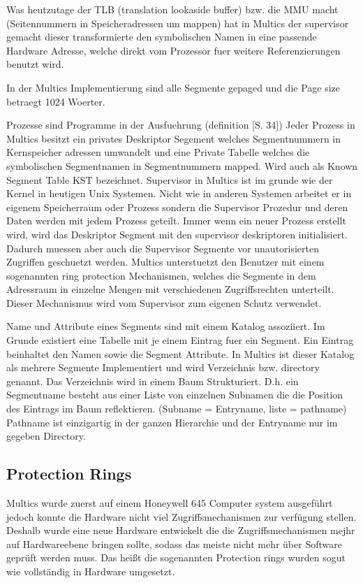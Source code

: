 \documentclass[9pt,technote]{IEEEtran}
\begin{document}
 Was heutzutage der TLB (translation lookaside buffer) bzw. die MMU macht (Seitennummern in Speicheradressen um mappen) hat in Multics der supervisor gemacht
 dieser transformierte den symbolischen Namen in eine passende Hardware Adresse, welche direkt vom Prozessor fuer weitere Referenzierungen benutzt wird.
 
 In der Multics Implementierung sind alle Segmente gepaged und die Page size betraegt 1024 Woerter.
 
 Prozesse sind Programme in der Ausfuehrung (definition \cite{inproc:multics}[S. 34]) Jeder Prozess in Multics besitzt ein privates Deskriptor Segement welches
 Segmentnummern in Kernspeicher adressen umwandelt und eine Private Tabelle welches die symbolischen Segmentnamen in Segmentnummern mapped. Wird
 auch als Known Segment Table KST bezeichnet. Supervisor in Multics ist im grunde wie der Kernel in heutigen Unix Systemen.
 Nicht wie in anderen Systemen arbeitet er in eigenem Speicherraum oder Prozess sondern die Supervisor Prozedur und deren Daten werden mit jedem Prozess geteilt. 
 Immer wenn ein neuer Prozess erstellt wird, wird das Deskriptor Segment mit den supervisor deskriptoren initialisiert. Dadurch muessen aber auch die Supervisor
 Segmente vor unautorisierten Zugriffen geschuetzt werden. Multics unterstuetzt den Benutzer mit einem sogenannten ring protection Mechanismen,
 welches die Segmente in dem Adressraum in einzelne Mengen mit verschiedenen Zugriffsrechten unterteilt. Dieser Mechanismus wird vom Supervisor zum
 eigenen Schutz verwendet.
 
 Name und Attribute eines Segments sind mit einem Katalog assoziiert. Im Grunde existiert eine Tabelle mit je einem Eintrag fuer ein Segment. 
 Ein Eintrag beinhaltet den Namen sowie die Segment Attribute. In Multics ist dieser Katalog als mehrere
 Segmente Implementiert und wird Verzeichnis bzw. directory genannt. Das Verzeichnis wird in einem Baum Strukturiert.
 D.h. ein Segmentname besteht aus einer Liste von einzelnen Subnamen die die Position des Eintrags im Baum reflektieren. (Subname = Entryname, liste = pathname)
 Pathname ist einzigartig in der ganzen Hierarchie und der Entryname nur im gegeben Directory.
  \subsection{Protection Rings}
    Multics wurde zuerst auf einem Honeywell 645 Computer system ausgef\"uhrt jedoch konnte die Hardware nicht viel Zugriffsmechanismen zur verf\"ugung stellen.
    Deshalb wurde eine neue Hardware entwickelt die die Zugriffsmechanismen mejhr auf Hardwareebene bringen sollte, sodass das meiste nicht mehr \"uber Software
    gepr\"uft werden muss. Das hei\ss t die sogenannten Protection rings wurden sogut wie vollst\"andig in Hardware umgesetzt. \cite{inproc:protec-rings}
    
\end{document}
